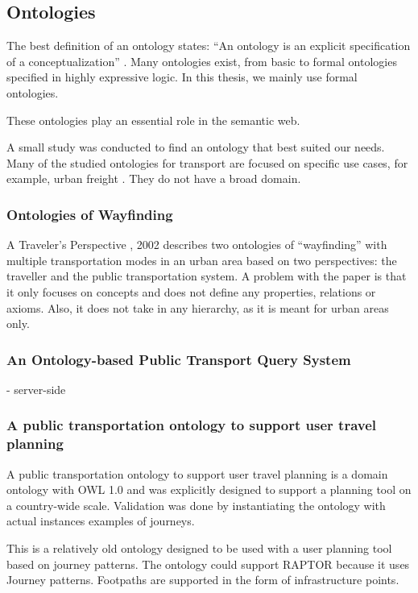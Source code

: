\subsection{Ontologies}
The best definition of an ontology states: “An ontology is an explicit specification of a conceptualization” \cite{gruber_translation_1993}. Many ontologies exist, from basic to formal ontologies specified in highly expressive logic. In this thesis, we mainly use formal ontologies.

These ontologies play an essential role in the semantic web. 

A small study was conducted to find an ontology that best suited our needs. Many of the studied ontologies for transport are focused on specific use cases, for example, urban freight \cite{bouhana_ontology-based_2015}. They do not have a broad domain. 

\subsubsection{Ontologies of Wayfinding}
A Traveler’s Perspective \cite{timpf_ontologies_2002}, 2002
describes two ontologies of “wayfinding” with multiple transportation modes in an urban area based on two perspectives: the traveller and the public transportation system. A problem with the paper is that it only focuses on concepts and does not define any properties, relations or axioms. Also, it does not take in any hierarchy, as it is meant for urban areas only.

\subsubsection{An Ontology-based Public Transport Query System}

- server-side 

\subsubsection{A public transportation ontology to support user travel planning}
 A public transportation ontology to support user travel planning \cite{houda_public_2010} is a domain ontology with OWL 1.0 and was explicitly designed to support a planning tool on a country-wide scale. Validation was done by instantiating the ontology with actual instances examples of journeys. 


This is a relatively old ontology designed to be used with a user planning tool based on journey patterns. The ontology could support RAPTOR because it uses Journey patterns. Footpaths are supported in the form of infrastructure points.

